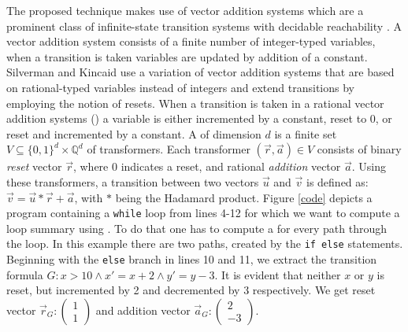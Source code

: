The proposed technique makes use of vector addition systems which are a prominent class of infinite-state transition systems with decidable reachability \cite{DBLP:conf/rp/HaaseH14}. A vector addition system consists of a finite number of integer-typed variables, when a transition is taken variables are updated by addition of a constant. Silverman and Kincaid use a variation of vector addition systems that are based on rational-typed variables instead of integers and extend transitions by employing the notion of resets. When a transition is taken in a rational vector addition systems (\qvasr) a variable is either incremented by a constant, reset to 0, or reset and incremented by a constant.
A \qvasr of dimension $d$ is a finite set $V \subseteq \{0, 1\}^d \times \mathbb{Q}^d$ of transformers. Each transformer $(\vec{r}, \vec{a}) \in V$ consists of binary \textsl{reset} vector $\vec{r}$, where 0 indicates a reset, and rational \textsl{addition} vector $\vec{a}$. Using these transformers, a transition between two vectors $\vec{u}$ and $\vec{v}$ is defined as: $\vec{v} = \vec{u} * \vec{r} + \vec{a}$, with $*$ being the Hadamard product. Figure \ref{code} depicts a program containing a \texttt{while} loop from lines 4-12 for which we want to compute a loop summary using \qvasr. To do that one has to compute a \qvasr for every path through the loop. In this example there are two paths, created by the \texttt{if else} statements. Beginning with the \texttt{else} branch in lines 10 and 11, we extract the transition formula $G: x > 10 \land x' = x + 2 \land y' = y - 3$. It is evident that neither $x$ or $y$ is reset, but incremented by 2 and decremented by 3 respectively. We get reset vector $\vec{r}_G: \begin{pmatrix} 1 \\ 1\end{pmatrix}$ and addition vector $\vec{a}_G: \begin{pmatrix} 2 \\ -3\end{pmatrix}$.  \par
